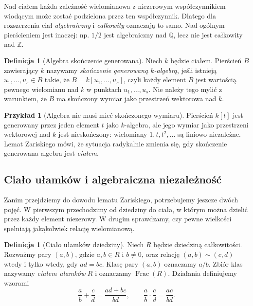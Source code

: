 \documentclass[11pt,a4paper,openany]{report}
\numberwithin{equation}{section}
\theoremstyle{plain}
\theoremstyle{definition}
\newtheorem{definicja}[twierdzenie]{Definicja}
\newtheorem{przyklad}[twierdzenie]{Przykład}
\theoremstyle{remark}
\newcommand{\Z}{\mathbb Z}
\newcommand{\Q}{\mathbb Q}
\newcommand{\Frac}{\operatorname{Frac}}
\begin{document}
Nad ciałem każda zależność wielomianowa z niezerowym
współczynnikiem wiodącym może zostać podzielona przez ten współczynnik.
Dlatego dla rozszerzenia ciał \emph{algebraiczny} i
\emph{całkowity} oznaczają to samo. Nad ogólnym pierścieniem jest
inaczej: np. $1/2$ jest algebraiczny nad $\Q$, lecz nie jest
całkowity nad $\Z$.

\begin{definicja}[Algebra skończenie generowana]
Niech $k$ będzie ciałem. Pierścień $B$ zawierający $k$
nazywamy \emph{skończenie generowaną $k$-algebrą}, jeśli
istnieją $u_1,\dots,u_s\in B$ takie, że
$B=k[u_1,\dots,u_s]$, czyli każdy element $B$ jest
wartością pewnego wielomianu nad $k$ w punktach $u_1,\dots,u_s$.
Nie należy tego mylić z warunkiem, że $B$ ma skończony wymiar
jako przestrzeń wektorowa nad $k$.
\end{definicja}

\begin{przyklad}[Algebra nie musi mieć skończonego wymiaru]
Pierścień $k[t]$ jest generowany przez jeden element $t$
jako $k$-algebra, ale jego wymiar jako przestrzeni wektorowej
nad $k$ jest nieskończony: wielomiany $1,t,t^2,\dots$
są liniowo niezależne. Lemat Zariskiego mówi, że sytuacja
radykalnie zmienia się, gdy skończenie generowana algebra
jest \emph{ciałem}.
\end{przyklad}

\subsection{Ciało ułamków i algebraiczna niezależność}

Zanim przejdziemy do dowodu lematu Zariskiego, potrzebujemy jeszcze
dwóch pojęć. W pierwszym przechodzimy od dziedziny do ciała,
w którym można dzielić przez każdy element niezerowy.
W drugim sprawdzamy, czy pewne wielkości spełniają jakąkolwiek
relację wielomianową.

\begin{definicja}[Ciało ułamków dziedziny]
Niech $R$ będzie dziedziną całkowitości.
Rozważmy pary $(a,b)$, gdzie $a,b\in R$ i $b\ne0$,
oraz relację $(a,b)\sim(c,d)$ wtedy i tylko wtedy,
gdy $ad=bc$. Klasę pary $(a,b)$ oznaczamy $a/b$.
Zbiór klas nazywamy \emph{ciałem ułamków} $R$
i oznaczamy $\Frac(R)$. Działania definiujemy wzorami
\[
\frac ab+\frac cd=\frac{ad+bc}{bd},\qquad
\frac ab\cdot\frac cd=\frac{ac}{bd}.
\]
\end{definicja}
\end{document}
